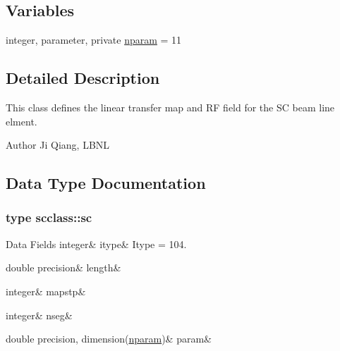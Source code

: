 \subsection*{Variables}
\begin{DoxyCompactItemize}
\item 
integer, parameter, private \mbox{\hyperlink{namespacescclass_a78eec9a89964d83818db291873df4436}{nparam}} = 11
\end{DoxyCompactItemize}


\subsection{Detailed Description}
This class defines the linear transfer map and RF field for the SC beam line elment. 

\begin{DoxyAuthor}{Author}
Ji Qiang, L\+B\+NL 
\end{DoxyAuthor}


\subsection{Data Type Documentation}
\label{structscclass_1_1sc}
\subsubsection{type scclass\+::sc}
\begin{DoxyFields}{Data Fields}
\mbox{\label{namespacescclass_a4ddd6baf3b915cf7ff25830e84ce6e75}} 
integer&
itype&
Itype = 104. \\
\hline

\mbox{\label{namespacescclass_ae9c1bce2c31838e6ec98bdbfe04cb6d7}} 
double precision&
length&
\\
\hline

\mbox{\label{namespacescclass_ac919c69cd2bb089386f56a5ac75728f0}} 
integer&
mapstp&
\\
\hline

\mbox{\label{namespacescclass_a32cf6178c767aecb2b10b7baa0221c78}} 
integer&
nseg&
\\
\hline

\mbox{\label{namespacescclass_a21e20d06bda8473fab959e3ee29e5183}} 
double precision, dimension(\mbox{\hyperlink{namespacescclass_a78eec9a89964d83818db291873df4436}{nparam}})&
param&
\\
\hline

\end{DoxyFields}


